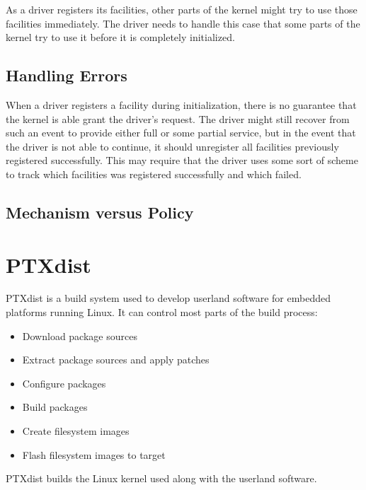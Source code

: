 As a driver registers its facilities, other parts of the kernel might try to use those facilities immediately. The driver needs to handle this case that some parts of the kernel try to use it before it is completely initialized.



\subsection{Handling Errors}
When a driver registers a facility during initialization, there is no guarantee that the kernel is able grant the driver's request. The driver might still recover from such an event to provide either full or some partial service, but in the event that the driver is not able to continue, it should unregister all facilities previously registered successfully. This may require that the driver uses some sort of scheme to track which facilities was registered successfully and which failed. 



\subsection{Mechanism versus Policy}



\section{PTXdist}\label{sec:ptxdist}
PTXdist is a build system used to develop userland software for embedded platforms running Linux. It can control most parts of the build process:
\begin{itemize}
  \item Download package sources
  \item Extract package sources and apply patches
  \item Configure packages
  \item Build packages
  \item Create filesystem images
  \item Flash filesystem images to target
\end{itemize}
PTXdist builds the Linux kernel used along with the userland software.


